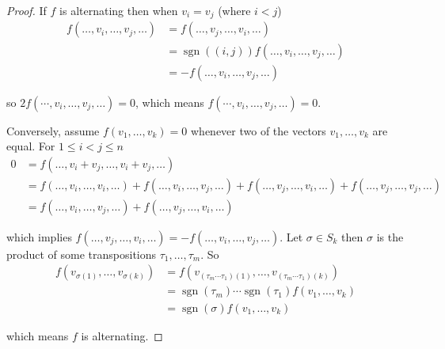 \begin{proof}
    If \( f \) is alternating then when \( v_{i} = v_{j} \) (where \( i < j \))
    \begingroup
    \allowdisplaybreaks%
    \begin{align*}
        f(\ldots, v_{i}, \ldots, v_{j}, \ldots) & = f(\ldots, v_{j}, \ldots, v_{i}, \ldots)                            \\
                                                & = \operatorname{sgn}((i, j)) f(\ldots, v_{i}, \ldots, v_{j}, \ldots) \\
                                                & = -f(\ldots, v_{i}, \ldots, v_{j}, \ldots)
    \end{align*}
    \endgroup

    so \( 2f(\cdots, v_{i}, \ldots, v_{j}, \ldots) = 0 \), which means \( f(\cdots, v_{i}, \ldots, v_{j}, \ldots) = 0 \).

    Conversely, assume \( f(v_{1}, \ldots, v_{k}) = 0 \) whenever two of the vectors \( v_{1}, \ldots, v_{k} \) are equal. For \( 1 \leq i < j \leq n \)
    \begingroup
    \allowdisplaybreaks%
    \begin{align*}
        0 & = f(\ldots, v_{i} + v_{j}, \ldots, v_{i} + v_{j}, \ldots)                                                                                                               \\
          & = f(\ldots, v_{i}, \ldots, v_{i}, \ldots) + f(\ldots, v_{i}, \ldots, v_{j}, \ldots) + f(\ldots, v_{j}, \ldots, v_{i}, \ldots) + f(\ldots, v_{j}, \ldots, v_{j}, \ldots) \\
          & = f(\ldots, v_{i}, \ldots, v_{j}, \ldots) + f(\ldots, v_{j}, \ldots, v_{i}, \ldots)
    \end{align*}
    \endgroup

    which implies \( f(\ldots, v_{j}, \ldots, v_{i}, \ldots) = -f(\ldots, v_{i}, \ldots, v_{j}, \ldots) \). Let \( \sigma \in S_{k} \) then \( \sigma \) is the product of some transpositions \( \tau_{1}, \ldots, \tau_{m} \). So
    \begingroup
    \allowdisplaybreaks%
    \begin{align*}
        f(v_{\sigma(1)}, \ldots, v_{\sigma(k)}) & = f(v_{(\tau_{m}\cdots\tau_{1})(1)}, \ldots, v_{(\tau_{m}\cdots\tau_{1})(k)})            \\
                                                & = \operatorname{sgn}(\tau_{m})\cdots\operatorname{sgn}(\tau_{1}) f(v_{1}, \ldots, v_{k}) \\
                                                & = \operatorname{sgn}(\sigma) f(v_{1}, \ldots, v_{k})
    \end{align*}
    \endgroup

    which means \( f \) is alternating.
\end{proof}

